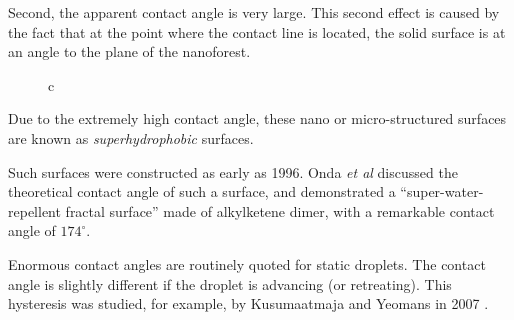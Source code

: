 \documentclass[12pt, a4paper, twoside, openright]{book}
\begin{document}
Second, the apparent contact angle is very large.  This second effect is caused by the fact that at the point where the contact line is located, the solid surface is at an angle to the plane of the nanoforest.

\begin{figure}
\centering
{}
\caption{c}\label{c}
\end{figure}

Due to the extremely high contact angle, these nano or micro-structured surfaces are known as \emph{superhydrophobic} surfaces.


\vspace*{1em}
Such surfaces were constructed as early as 1996.  Onda \emph{et al} \cite{Onda1996} discussed the theoretical contact angle of such a surface, and demonstrated a ``super-water-repellent fractal surface'' made of alkylketene dimer, with a remarkable contact angle of $174^{\circ}$.

Enormous contact angles are routinely quoted for static droplets.  The contact angle is slightly different if the droplet is advancing (or retreating).  This hysteresis was studied, for example, by Kusumaatmaja and Yeomans in 2007 \cite{KusumaatmajaYeomans2007}.
\end{document}
